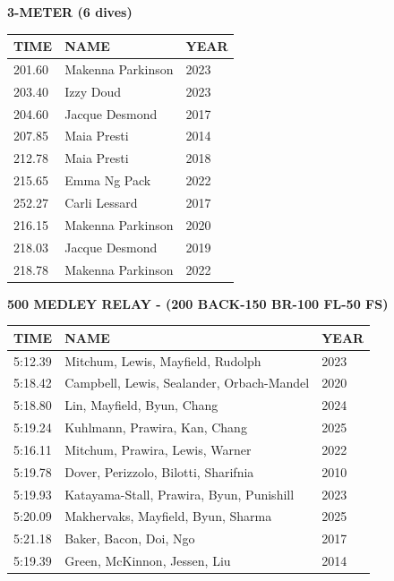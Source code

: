 \begin{table}[H]
\centering
\begin{minipage}[t]{0.6\textwidth}
\centering
\textbf{3-METER (6 dives)}\\[0.1cm]
\begin{tabular}{@{}p{1.8cm}p{2.8cm}p{1.2cm}@{}}
\hline
    \textbf{TIME} & \textbf{NAME} & \textbf{YEAR} \\
\hline
    201.60 & Makenna Parkinson & 2023 \\
    203.40 & Izzy Doud & 2023 \\
    204.60 & Jacque Desmond & 2017 \\
    207.85 & Maia Presti & 2014 \\
    212.78 & Maia Presti & 2018 \\
    215.65 & Emma Ng Pack & 2022 \\
    252.27 & Carli Lessard & 2017 \\
    216.15 & Makenna Parkinson & 2020 \\
    218.03 & Jacque Desmond & 2019 \\
    218.78 & Makenna Parkinson & 2022 \\
\hline
\end{tabular}
\end{minipage}
\end{table}

\begin{table}[H]
\centering
\begin{minipage}[t]{0.6\textwidth}
\centering
\textbf{500 MEDLEY RELAY - (200 BACK-150 BR-100 FL-50 FS)}\\[0.1cm]
\begin{tabular}{@{}p{1.8cm}p{2.8cm}p{1.2cm}@{}}
\hline
    \textbf{TIME} & \textbf{NAME} & \textbf{YEAR} \\
\hline
    5:12.39 & Mitchum, Lewis, Mayfield, Rudolph & 2023 \\
    5:18.42 & Campbell, Lewis, Sealander, Orbach-Mandel & 2020 \\
    5:18.80 & Lin, Mayfield, Byun, Chang & 2024 \\
    5:19.24 & Kuhlmann, Prawira, Kan, Chang & 2025 \\
    5:16.11 & Mitchum, Prawira, Lewis, Warner & 2022 \\
    5:19.78 & Dover, Perizzolo, Bilotti, Sharifnia & 2010 \\
    5:19.93 & Katayama-Stall, Prawira, Byun, Punishill & 2023 \\
    5:20.09 & Makhervaks, Mayfield, Byun, Sharma & 2025 \\
    5:21.18 & Baker, Bacon, Doi, Ngo & 2017 \\
    5:19.39 & Green, McKinnon, Jessen, Liu & 2014 \\
\hline
\end{tabular}
\end{minipage}
\end{table}

